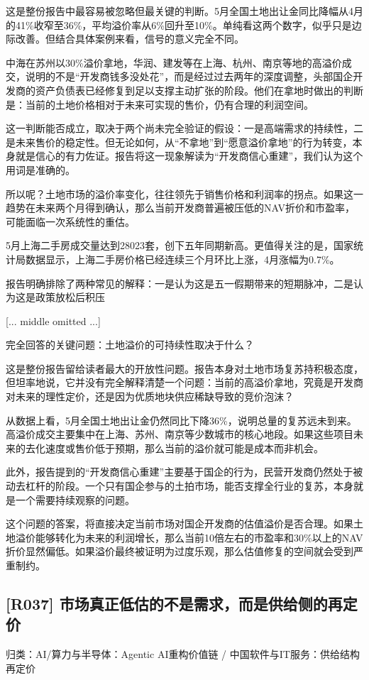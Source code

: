 \documentclass[11pt]{ctexart}
\begin{document}
这是整份报告中最容易被忽略但最关键的判断。5月全国土地出让金同比降幅从4月的41\%收窄至36\%，平均溢价率从6\%回升至10\%。单纯看这两个数字，似乎只是边际改善。但结合具体案例来看，信号的意义完全不同。

中海在苏州以30\%溢价拿地，华润、建发等在上海、杭州、南京等地的高溢价成交，说明的不是“开发商钱多没处花”，而是经过过去两年的深度调整，头部国企开发商的资产负债表已经修复到足以支撑主动扩张的阶段。他们在拿地时做出的判断是：当前的土地价格相对于未来可实现的售价，仍有合理的利润空间。

这一判断能否成立，取决于两个尚未完全验证的假设：一是高端需求的持续性，二是未来售价的稳定性。但无论如何，从“不拿地”到“愿意溢价拿地”的行为转变，本身就是信心的有力佐证。报告将这一现象解读为“开发商信心重建”，我们认为这个用词是准确的。

所以呢？土地市场的溢价率变化，往往领先于销售价格和利润率的拐点。如果这一趋势在未来两个月得到确认，那么当前开发商普遍被压低的NAV折价和市盈率，可能面临一次系统性的重估。

5月上海二手房成交量达到28023套，创下五年同期新高。更值得关注的是，国家统计局数据显示，上海二手房价格已经连续三个月环比上涨，4月涨幅为0.7\%。

报告明确排除了两种常见的解释：一是认为这是五一假期带来的短期脉冲，二是认为这是政策放松后积压

[... middle omitted ...]

完全回答的关键问题：土地溢价的可持续性取决于什么？

这是整份报告留给读者最大的开放性问题。报告本身对土地市场复苏持积极态度，但坦率地说，它并没有完全解释清楚一个问题：当前的高溢价拿地，究竟是开发商对未来的理性定价，还是因为优质地块供应稀缺导致的竞价泡沫？

从数据上看，5月全国土地出让金仍然同比下降36\%，说明总量的复苏远未到来。高溢价成交主要集中在上海、苏州、南京等少数城市的核心地段。如果这些项目未来的去化速度或售价低于预期，那么当前的溢价就可能是成本而非机会。

此外，报告提到的“开发商信心重建”主要基于国企的行为，民营开发商仍然处于被动去杠杆的阶段。一个只有国企参与的土拍市场，能否支撑全行业的复苏，本身就是一个需要持续观察的问题。

这个问题的答案，将直接决定当前市场对国企开发商的估值溢价是否合理。如果土地溢价能够转化为未来的利润增长，那么当前10倍左右的市盈率和30\%以上的NAV折价显然偏低。如果溢价最终被证明为过度乐观，那么估值修复的空间就会受到严重制约。

\subsection{[R037] 市场真正低估的不是需求，而是供给侧的再定价}
{\small\color{refgray}归类：AI/算力与半导体：Agentic AI重构价值链 / 中国软件与IT服务：供给结构再定价}
\end{document}
